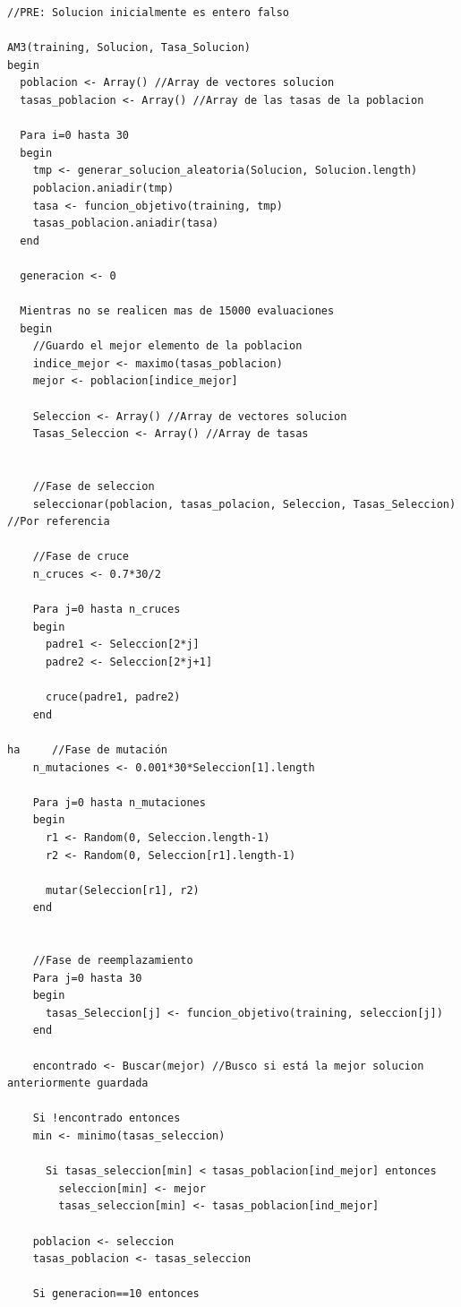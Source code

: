 \begin{lstlisting}
//PRE: Solucion inicialmente es entero falso

AM3(training, Solucion, Tasa_Solucion)
begin
  poblacion <- Array() //Array de vectores solucion
  tasas_poblacion <- Array() //Array de las tasas de la poblacion

  Para i=0 hasta 30
  begin
    tmp <- generar_solucion_aleatoria(Solucion, Solucion.length)
    poblacion.aniadir(tmp)
    tasa <- funcion_objetivo(training, tmp)
    tasas_poblacion.aniadir(tasa)
  end

  generacion <- 0

  Mientras no se realicen mas de 15000 evaluaciones
  begin
    //Guardo el mejor elemento de la poblacion
    indice_mejor <- maximo(tasas_poblacion)
    mejor <- poblacion[indice_mejor]

    Seleccion <- Array() //Array de vectores solucion
    Tasas_Seleccion <- Array() //Array de tasas


    //Fase de seleccion
    seleccionar(poblacion, tasas_polacion, Seleccion, Tasas_Seleccion) //Por referencia

    //Fase de cruce
    n_cruces <- 0.7*30/2

    Para j=0 hasta n_cruces
    begin
      padre1 <- Seleccion[2*j]
      padre2 <- Seleccion[2*j+1]

      cruce(padre1, padre2)
    end

ha     //Fase de mutación
    n_mutaciones <- 0.001*30*Seleccion[1].length

    Para j=0 hasta n_mutaciones
    begin
      r1 <- Random(0, Seleccion.length-1)
      r2 <- Random(0, Seleccion[r1].length-1)

      mutar(Seleccion[r1], r2)
    end


    //Fase de reemplazamiento
    Para j=0 hasta 30
    begin
      tasas_Seleccion[j] <- funcion_objetivo(training, seleccion[j])
    end

    encontrado <- Buscar(mejor) //Busco si está la mejor solucion anteriormente guardada

    Si !encontrado entonces
    min <- minimo(tasas_seleccion)

      Si tasas_seleccion[min] < tasas_poblacion[ind_mejor] entonces
        seleccion[min] <- mejor
        tasas_seleccion[min] <- tasas_poblacion[ind_mejor]

    poblacion <- seleccion
    tasas_poblacion <- tasas_seleccion
    
    Si generacion==10 entonces
    

\end{lstlisting}
